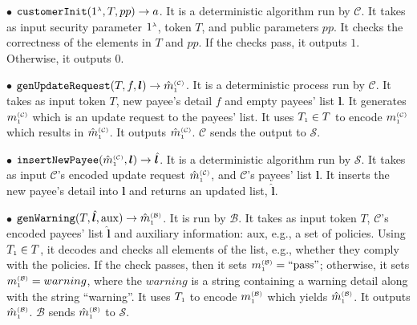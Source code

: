 \begin{definition}
\vspace{2mm}
\item[$\bullet$] $\mathtt{customerInit} (1^{\scriptscriptstyle \lambda}, T, pp)\rightarrow a$. It is a deterministic  algorithm run by  $\mathcal{C}$. It takes as input security parameter $1^{\scriptscriptstyle \lambda}$,  token $T$, and public parameters $pp$. It checks the correctness of the elements in $T$ and $pp$. If the checks pass, it outputs $1$. Otherwise, it outputs $0$. 

\vspace{2mm}
\item [$\bullet$] $\mathtt{genUpdateRequest}(T, f, {\bm l})\rightarrow \hat m^{\scriptscriptstyle\mathcal{(C)}}_{\scriptscriptstyle 1}$.  It is a deterministic process run by $\mathcal{C}$.  It takes as input token $T$,  new payee's detail $f$ and empty payees' list $ {\bm l}$. It  generates $m^{\scriptscriptstyle\mathcal{(C)}}_{\scriptscriptstyle 1}$ which is an  update request to the payees' list. It uses $T_{\scriptscriptstyle 1}\in T$ to encode $m^{\scriptscriptstyle\mathcal{(C)}}_{\scriptscriptstyle 1}$ which results in $\hat {m}^{\scriptscriptstyle\mathcal{(C)}}_{\scriptscriptstyle 1}$. It outputs $\hat  m^{\scriptscriptstyle\mathcal{(C)}}_{\scriptscriptstyle 1}$. $\mathcal{C}$ sends the output to $\mathcal{S}$.
%
\vspace{2mm}
\item [$\bullet$] $\mathtt{insertNewPayee}(\hat{m}^{\scriptscriptstyle\mathcal{(C)}}_{\scriptscriptstyle 1}, {\bm l})\rightarrow  \hat{\bm l}$. It is a deterministic algorithm run by $\mathcal{S}$. It takes as input $\mathcal{C}$'s encoded update request  $\hat{m}^{\scriptscriptstyle\mathcal{(C)}}_{\scriptscriptstyle 1}$, and $\mathcal{C}$'s payees' list ${\bm l}$. It inserts the new payee's detail into ${\bm l}$ and returns an updated list, $\hat{\bm l}$.
%
\vspace{2mm}
\item  [$\bullet$] $\mathtt{genWarning}(T, \hat{\bm l}, \text{aux})\rightarrow \hat m^{\scriptscriptstyle\mathcal{(B)}}_{\scriptscriptstyle1}$. It is run by $\mathcal{B}$. It takes as input token $T$, $\mathcal{C}$'s encoded   payees' list $ \hat{\bm l}$ and auxiliary information: $\text{aux}$, e.g., a set of policies. Using $T_{\scriptscriptstyle 1}\in T$, it decodes and checks  all elements of the list, e.g., whether they comply with the policies. If the check  passes, then it sets $m^{\scriptscriptstyle\mathcal{(B)}}_{\scriptscriptstyle1}=\text{``pass''}$; otherwise, it sets $m^{\scriptscriptstyle\mathcal{(B)}}_{\scriptscriptstyle1}={warning}$, where the $warning$ is a string  containing a warning detail along with
the string ``warning''. It uses  $T_{\scriptscriptstyle 1}$ to encode $m^{\scriptscriptstyle\mathcal{(B)}}_{\scriptscriptstyle1}$ which yields $\hat m^{\scriptscriptstyle\mathcal{(B)}}_{\scriptscriptstyle1}$. It outputs  $\hat m^{\scriptscriptstyle\mathcal{(B)}}_{\scriptscriptstyle1}$.  $\mathcal{B}$ sends $\hat m^{\scriptscriptstyle\mathcal{(B)}}_{\scriptscriptstyle1}$ to $\mathcal{S}$.

\end{definition}
